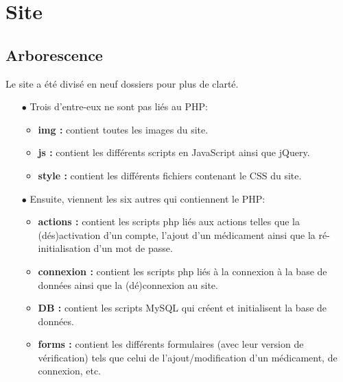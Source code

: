 \section{Site}
\label{sec:site}


\subsection{Arborescence}
\label{sec:arborescence}

Le site a été divisé en neuf dossiers pour plus de clarté.

\begin{itemize}

    \item[$\bullet$] Trois d’entre-eux ne sont pas liés au PHP:
    \begin{itemize}
    
         \item \textbf{img :} contient toutes les images du site.
         
         \item \textbf{js :} contient les différents scripts en JavaScript ainsi que jQuery.
         
         \item \textbf{style :} contient les différents fichiers contenant le CSS du site.
         
    \end{itemize}
    
    \item[$\bullet$] Ensuite, viennent les six autres qui contiennent le PHP:
    \begin{itemize}
    
         \item \textbf{actions :} contient les scripts php liés aux actions telles que la\\ (dés)activation d’un compte, l’ajout d’un médicament ainsi que la ré-initialisation d’un mot de passe.
         
         \item \textbf{connexion :} contient les scripts php liés à la connexion à la base de données ainsi que la (dé)connexion au site.
         
         \item \textbf{DB :} contient les scripts MySQL qui créent et initialisent la base de données.
         
         \item \textbf{forms :} contient les différents formulaires (avec leur version de vérification) tels que celui de l’ajout/modification d’un médicament, de\\ connexion, etc.
         

\end{itemize}
\end{itemize}
